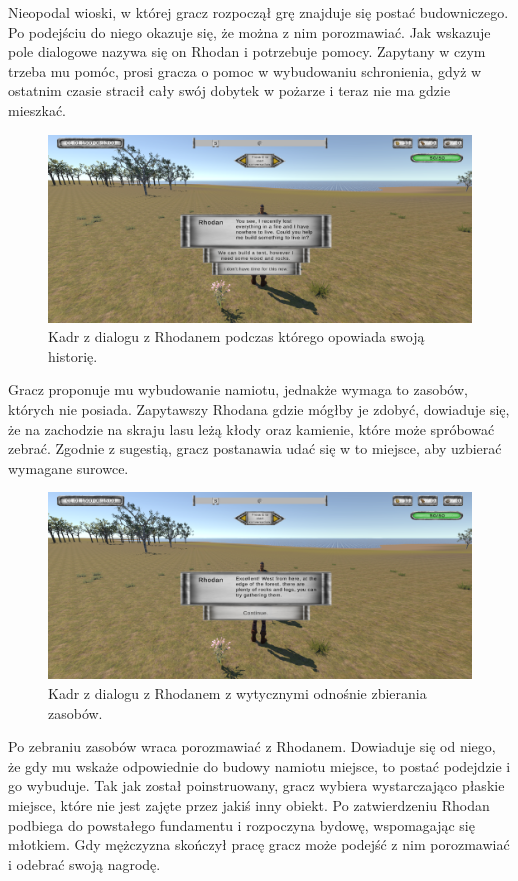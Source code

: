 Nieopodal wioski, w której gracz rozpoczął grę znajduje się postać budowniczego. Po podejściu do niego okazuje się, że
można z nim porozmawiać. Jak wskazuje pole dialogowe nazywa się on Rhodan i potrzebuje pomocy. Zapytany w czym trzeba mu
pomóc, prosi gracza o pomoc w wybudowaniu schronienia, gdyż w ostatnim czasie stracił cały swój dobytek w pożarze i
teraz nie ma gdzie mieszkać.

\begin{figure}[h!]
    \centering
    \includegraphics[width=1\textwidth]{images/rozgrywka/rhodan3.png}
    \caption{Kadr z dialogu z Rhodanem podczas którego opowiada swoją historię.}
\end{figure}

Gracz proponuje mu wybudowanie namiotu, jednakże wymaga to zasobów, których nie posiada. Zapytawszy Rhodana gdzie mógłby
je zdobyć, dowiaduje się, że na zachodzie na skraju lasu leżą kłody oraz kamienie, które może spróbować zebrać. Zgodnie
z sugestią, gracz postanawia udać się w to miejsce, aby uzbierać wymagane surowce.

\begin{figure}[h!]
    \centering
    \includegraphics[width=1\textwidth]{images/rozgrywka/rhodan4.png}
    \caption{Kadr z dialogu z Rhodanem z wytycznymi odnośnie zbierania zasobów.}
\end{figure}

Po zebraniu zasobów wraca porozmawiać z Rhodanem. Dowiaduje się od niego, że gdy mu wskaże odpowiednie do budowy namiotu
miejsce, to postać podejdzie i go wybuduje. Tak jak został poinstruowany, gracz wybiera wystarczająco płaskie miejsce,
które nie jest zajęte przez jakiś inny obiekt. Po zatwierdzeniu Rhodan podbiega do powstałego fundamentu i rozpoczyna
bydowę, wspomagając się młotkiem. Gdy mężczyzna skończył pracę gracz może podejść z nim porozmawiać i odebrać swoją
nagrodę.

